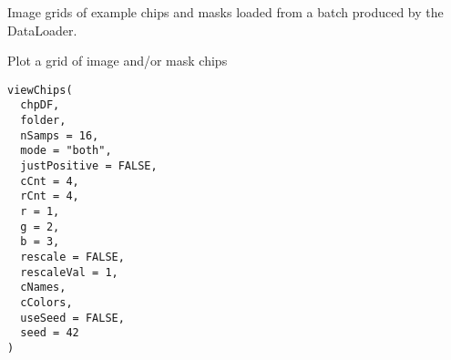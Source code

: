 \documentclass[a4paper]{book}
\begin{document}
%
\begin{Value}
Image grids of example chips and masks loaded from a batch produced by the DataLoader.
\end{Value}
%
\begin{Description}\relax
Plot a grid of image and/or mask chips
\end{Description}
%
\begin{Usage}
\begin{verbatim}
viewChips(
  chpDF,
  folder,
  nSamps = 16,
  mode = "both",
  justPositive = FALSE,
  cCnt = 4,
  rCnt = 4,
  r = 1,
  g = 2,
  b = 3,
  rescale = FALSE,
  rescaleVal = 1,
  cNames,
  cColors,
  useSeed = FALSE,
  seed = 42
)
\end{verbatim}
\end{Usage}
%
\end{document}

